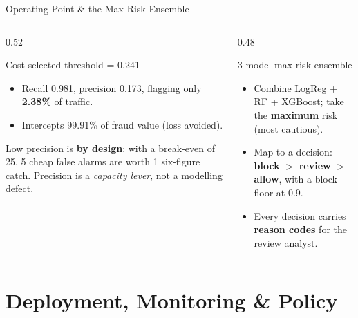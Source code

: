 \documentclass[t, aspectratio=169]{beamer} %
\begin{document}
\begin{frame}{Operating Point \& the Max-Risk Ensemble}
	\begin{columns}[T]
		\begin{column}{0.52\textwidth}
			\begin{block}{Cost-selected threshold = 0.241}
				\begin{itemize}
					\item Recall \alert{0.981}, precision \alert{0.173}, flagging
					      only \textbf{2.38\%} of traffic.
					\item Intercepts \alert{99.91\%} of fraud value (loss avoided).
				\end{itemize}
			\end{block}
			\small Low precision is \textbf{by design}: with a break-even of 25,
			5 cheap false alarms are worth 1 six-figure catch. Precision is a
			\emph{capacity lever}, not a modelling defect.
		\end{column}
		\begin{column}{0.48\textwidth}
			\begin{alertblock}{3-model max-risk ensemble}
				\begin{itemize}
					\item Combine LogReg + RF + XGBoost; take the
					      \textbf{maximum} risk (most cautious).
					\item Map to a decision: \textbf{block} $>$ \textbf{review}
					      $>$ \textbf{allow}, with a block floor at 0.9.
					\item Every decision carries \textbf{reason codes} for the
					      review analyst.
				\end{itemize}
			\end{alertblock}
		\end{column}
	\end{columns}
\end{frame}

\section{Deployment, Monitoring \& Policy}
\end{document}
